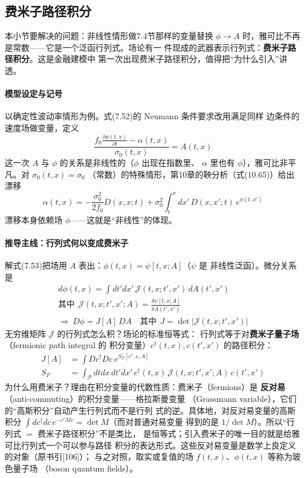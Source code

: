 \subsection{费米子路径积分}

本小节要解决的问题：非线性情形做7.4节那样的变量替换
$\phi\to A$ 时，雅可比不再是常数——它是一个泛函行列式。场论有一
件现成的武器表示行列式：\textbf{费米子路径积分}。这是金融建模中
第一次出现费米子路径积分，值得把“为什么引入”讲透。

\paragraph{模型设定与记号}
以确定性波动率情形为例。式(7.52)的 Neumann 条件要求改用满足同样
边条件的速度场做变量，定义
\begin{equation*}
\frac{f_0\frac{\partial\phi(t,x)}{\partial t}-\alpha(t,x)}
{\sigma_0(t,x)}=A(t,x)
\tag{7.53}
\end{equation*}
这一次 $A$ 与 $\phi$ 的关系是非线性的（$\phi$ 出现在指数里、
$\alpha$ 里也有 $\phi$），雅可比非平凡。对 $\sigma_0(t,x)=\sigma_0$
（常数）的特殊情形，第10章的鞅分析（式(10.65)）给出漂移
\begin{equation*}
\alpha(t,x)=-\frac{\sigma_0^{2}}{2f_0}D(x,x;t)
+\sigma_0^{2}\int_{t}^{x}dx'\,D(x,x';t)\,e^{\phi(t,x')}
\end{equation*}
漂移本身依赖场 $\phi$——这就是“非线性”的体现。

\paragraph{推导主线：行列式何以变成费米子}
解式(7.53)把场用 $A$ 表出：$\phi(t,x)=\psi[t,x;A]$（$\psi$ 是
非线性泛函）。微分关系是
\begin{gather*}
d\phi(t,x)=\int dt'dx'\,\mathcal{J}(t,x;t',x')\,dA(t',x')\\
\text{其中}\ \ \mathcal{J}(t,x;t',x';A)=
\frac{\delta\psi[t,x;A]}{\delta A(t',x')}\\
\Rightarrow\ D\phi=J[A]\,DA\quad\text{其中}\ \
J=\det\bigl|\mathcal{J}(t,x;t',x')\bigr|
\end{gather*}
无穷维矩阵 $\mathcal{J}$ 的行列式怎么积？场论的标准恒等式：
行列式等于对\textbf{费米子量子场}（fermionic path integral 的
积分变量）$c^{\dagger}(t,x),c(t',x')$ 的路径积分：
\begin{align*}
J[A]&=\int Dc^{\dagger}Dc\ e^{S_F[c^{\dagger},c,A]}\\
S_F&=\int_{\mathcal{P}}dtdx\,dt'dx'\,c^{\dagger}(t,x)\,
\mathcal{J}(t,x;t',x';A)\,c(t',x')
\tag{7.54}
\end{align*}
为什么用费米子？理由在积分变量的代数性质：费米子（fermions）是
\textbf{反对易}（anti-commuting）的积分变量——格拉斯曼变量
（Grassmann variable），它们的“高斯积分”自动产生行列式而不是行列
式的逆。具体地，对反对易变量的高斯积分
$\int dc^{\dagger}dc\,e^{-c^{\dagger}Mc}=\det M$（而对普通对易变量
得到的是 $1/\det M$）。所以“行列式 $=$ 费米子路径积分”不是类比，
是恒等式；引入费米子的唯一目的就是给雅可比行列式一个可以参与路径
积分的表达形式。这些反对易变量是数学上良定义的对象（原书引[106]）；
与之对照，取实或复值的场 $f(t,x)$、$\phi(t,x)$ 等称为玻色量子场
（boson quantum fields）。


